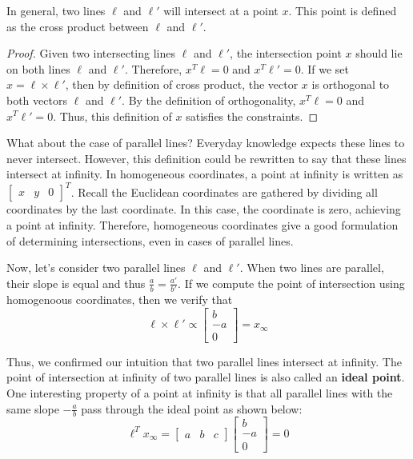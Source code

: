 \documentclass[a4paper, 12pt]{article}
\renewcommand\emph{\textbf}
\begin{document}
In general, two lines $\ell$ and $\ell'$ will intersect at a point $x$. This point is defined as the cross product between $\ell$ and $\ell'$.

\begin{proof} 
    Given two intersecting lines $\ell$ and $\ell'$, the intersection point $x$ should lie on both lines $\ell$ and $\ell'$. Therefore, $x^T \ell = 0$ and $x^T\ell' = 0$. If we set $x = \ell \times \ell'$, then by definition of cross product, the vector $x$ is orthogonal to both vectors $\ell$ and $\ell'$. By the definition of orthogonality, $x^T \ell = 0$ and $x^T\ell' = 0$. Thus, this definition of $x$ satisfies the constraints. 
\end{proof}

What about the case of parallel lines? Everyday knowledge expects these lines to never intersect. However, this definition could be rewritten to say that these lines intersect at infinity. In homogeneous coordinates, a point at infinity is written as $\begin{bmatrix}x & y & 0\end{bmatrix}^T$. Recall the Euclidean coordinates are gathered by dividing all coordinates by the last coordinate. In this case, the coordinate is zero, achieving a point at infinity. Therefore, homogeneous coordinates give a good formulation of determining intersections, even in cases of parallel lines.

Now, let's consider two parallel lines $\ell$ and $\ell'$. When two lines are parallel, their slope is equal and thus $\frac{a}{b} = \frac{a'}{b'}$. If we compute the point of intersection using homogenoous coordinates, then we verify that
\begin{equation}
\ell \times \ell' \propto \begin{bmatrix}b \\ -a \\ 0  \end{bmatrix}= x_\infty
\end{equation}

Thus, we confirmed our intuition that two parallel lines intersect at infinity. The point of intersection at infinity of two parallel lines is also called an \emph{ideal point}. One interesting property of a point at infinity is that all parallel lines with the same slope $-\frac{a}{b}$ pass through the ideal point as shown below:
\begin{equation}
\ell ^T x_\infty = \begin{bmatrix}a & b & c\end{bmatrix} \begin{bmatrix}b \\ -a \\ 0\end{bmatrix} = 0
\end{equation}
\end{document}
